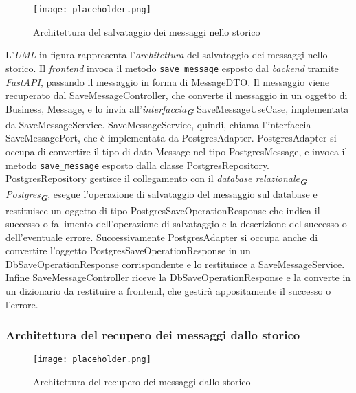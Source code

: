 \begin{figure}[h]
    \centering
    \texttt{[image: placeholder.png]}
    \caption{Architettura del salvataggio dei messaggi nello storico}
\end{figure}

L'\emph{UML} in figura rappresenta l'\emph{architettura} del salvataggio dei messaggi nello storico.
Il \emph{frontend} invoca il metodo \texttt{save\_message} esposto dal \emph{backend} tramite \emph{FastAPI}, passando il messaggio in forma di MessageDTO.
Il messaggio viene recuperato dal SaveMessageController, che converte il messaggio in un oggetto di Business, Message, e lo invia all'\emph{interfaccia}\textsubscript{\textbf{\textit{G}}} SaveMessageUseCase, implementata da SaveMessageService.
SaveMessageService, quindi, chiama l'interfaccia SaveMessagePort, che è implementata da PostgresAdapter.
PostgresAdapter si occupa di convertire il tipo di dato Message nel tipo PostgresMessage, e invoca il metodo \texttt{save\_message} esposto dalla classe PostgresRepository.
PostgresRepository gestisce il collegamento con il \emph{database relazionale}\textsubscript{\textbf{\textit{G}}} \emph{Postgres}\textsubscript{\textbf{\textit{G}}},
esegue l'operazione di salvataggio del messaggio sul database e restituisce un oggetto di tipo PostgresSaveOperationResponse che indica il successo o fallimento dell'operazione di salvataggio e la descrizione del successo o dell'eventuale errore.
Successivamente PostgresAdapter si occupa anche di convertire l'oggetto PostgresSaveOperationResponse in un DbSaveOperationResponse corrispondente e lo restituisce a SaveMessageService.
Infine SaveMessageController riceve la DbSaveOperationResponse e la converte in un dizionario da restituire a frontend, che gestirà appositamente il successo o l'errore.

\newpage


\subsubsection{Architettura del recupero dei messaggi dallo storico}
\label{sec:architettura_recupero_messaggi_storico}

\begin{figure}[h]
    \centering
    \texttt{[image: placeholder.png]}
    \caption{Architettura del recupero dei messaggi dallo storico}
\end{figure}

